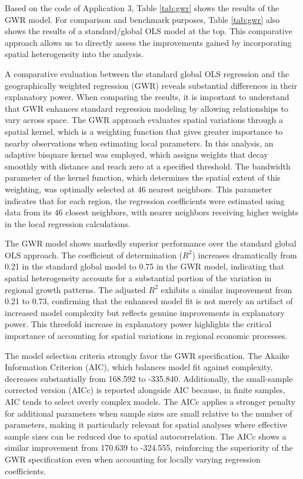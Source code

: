 \documentclass[smallextended, natbib]{svjour3}       %
\begin{document}
Based on the code of Application 3, Table \ref{tab:gwr} shows the results of the GWR model. 
For comparison and benchmark purposes, Table \ref{tab:gwr} also shows the results of a standard/global OLS model at the top. 
This comparative approach allows us to directly assess the improvements gained by incorporating spatial heterogeneity into the analysis.

A comparative evaluation between the standard global  OLS regression and the geographically weighted regression (GWR) reveals substantial differences in their explanatory power. 
When comparing the results, it is important to understand that GWR enhances standard regression modeling by allowing relationships to vary across space. 
The GWR approach evaluates spatial variations through a spatial kernel, which is a weighting function that gives greater importance to nearby observations when estimating local parameters. 
In this analysis, an adaptive bisquare kernel was employed, which assigns weights that decay smoothly with distance and reach zero at a specified threshold. 
The bandwidth parameter of the kernel function, which determines the spatial extent of this weighting, was optimally selected at 46 nearest neighbors. 
This parameter indicates that for each region, the regression coefficients were estimated using data from its 46 closest neighbors, with nearer neighbors receiving higher weights in the local regression calculations.

The GWR model shows markedly superior performance over the standard global  OLS approach. 
The coefficient of determination ($R^2$) increases dramatically from 0.21 in the standard global  model to 0.75 in the GWR model, indicating that spatial heterogeneity accounts for a substantial portion of the variation in regional growth patterns. 
The adjusted $R^2$ exhibits a similar improvement from 0.21 to 0.73, confirming that the enhanced model fit is not merely an artifact of increased model complexity but reflects genuine improvements in explanatory power. 
This threefold increase in explanatory power highlights the critical importance of accounting for spatial variations in regional economic processes.

The model selection criteria strongly favor the GWR specification. 
The Akaike Information Criterion (AIC), which balances model fit against complexity, decreases substantially from 168.592 to -335.840. 
Additionally, the small-sample corrected version (AICc) is reported alongside AIC because, in finite samples, AIC tends to select overly complex models. 
The AICc applies a stronger penalty for additional parameters when sample sizes are small relative to the number of parameters, making it particularly relevant for spatial analyses where effective sample sizes can be reduced due to spatial autocorrelation. 
The AICc shows a similar improvement from 170.639 to -324.555, reinforcing the superiority of the GWR specification even when accounting for locally varying regression coefficients.
\end{document}
